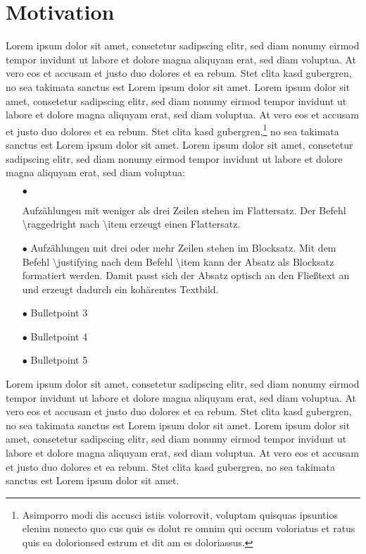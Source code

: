 \section{Motivation}
\label{sec:Motivation}
Lorem ipsum dolor sit amet, consetetur sadipscing elitr, sed diam nonumy eirmod tempor invidunt ut labore et dolore magna aliquyam erat, sed diam voluptua. At vero eos et accusam et justo duo dolores et ea rebum. Stet clita kasd gubergren, no sea takimata sanctus est Lorem ipsum dolor sit amet. Lorem ipsum dolor sit amet, consetetur sadipscing elitr, sed diam nonumy eirmod tempor invidunt ut labore et dolore magna aliquyam erat, sed diam voluptua. At vero eos et accusam et justo duo dolores et ea rebum. Stet clita kasd gubergren,\footnote{Asimporro modi dis accusci istiis volorrovit, voluptam quisquas ipsuntios elenim nonecto quo cus quis es dolut re omnim qui occum voloriatus et ratus quis ea dolorionsed estrum et dit am es doloriassus.} no sea takimata sanctus est Lorem ipsum dolor sit amet. Lorem ipsum dolor sit amet, consetetur sadipscing elitr, sed diam nonumy eirmod tempor invidunt ut labore et dolore magna aliquyam erat, sed diam voluptua:

\begin{itemize}
\label{itm:BeispielItemize}
\item[$\bullet$] \raggedright Aufzählungen mit weniger als drei Zeilen stehen im Flattersatz. Der Befehl \glqq \textbackslash raggedright\grqq{} nach \glqq \textbackslash item\grqq{} erzeugt einen Flattersatz.
\item[$\bullet$] \justifying Aufzählungen mit drei oder mehr Zeilen stehen im Blocksatz. Mit dem Befehl \glqq \textbackslash justifying\grqq{} nach dem Befehl \glqq \textbackslash item\grqq{} kann der Absatz als Blocksatz formatiert werden. Damit passt sich der Absatz optisch an den Fließtext an und erzeugt dadurch ein kohärentes Textbild.
\item[$\bullet$] Bulletpoint 3
\item[$\bullet$] Bulletpoint 4
\item[$\bullet$] Bulletpoint 5
\end{itemize}

Lorem ipsum dolor sit amet, consetetur sadipscing elitr, sed diam nonumy eirmod tempor invidunt ut labore et dolore magna aliquyam erat, sed diam voluptua. At vero eos et accusam et justo duo dolores et ea rebum. Stet clita kasd gubergren, no sea takimata sanctus est Lorem ipsum dolor sit amet. Lorem ipsum dolor sit amet, consetetur sadipscing elitr, sed diam nonumy eirmod tempor invidunt ut labore et dolore magna aliquyam erat, sed diam voluptua. At vero eos et accusam et justo duo dolores et ea rebum. Stet clita kasd gubergren, no sea takimata sanctus est Lorem ipsum dolor sit amet.

